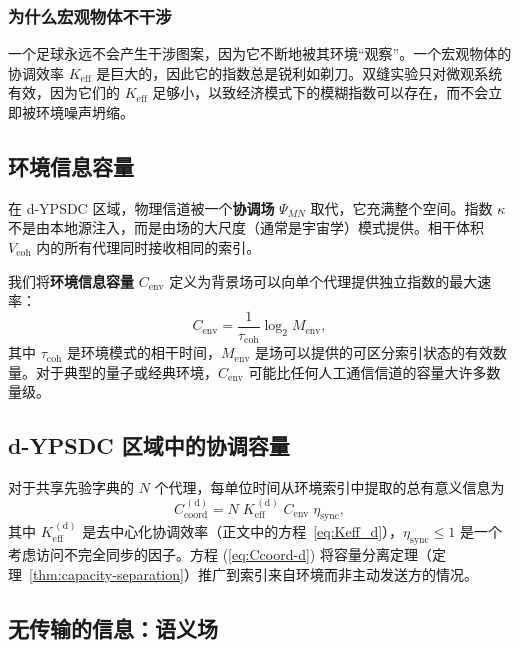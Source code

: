 \documentclass[12pt,a4paper]{article}
\theoremstyle{remark}
\begin{document}
	\subsubsection{为什么宏观物体不干涉}
	
	一个足球永远不会产生干涉图案，因为它不断地被其环境“观察”。一个宏观物体的协调效率 $K_{\mathrm{eff}}$ 是巨大的，因此它的指数总是锐利如剃刀。双缝实验只对微观系统有效，因为它们的 $K_{\mathrm{eff}}$ 足够小，以致经济模式下的模糊指数可以存在，而不会立即被环境噪声坍缩。
	
	\subsection{环境信息容量}
	\label{subsec:env-capacity}
	
	在 d-YPSDC 区域，物理信道被一个\textbf{协调场} $\Psi_{MN}$ 取代，它充满整个空间。指数 $\kappa$ 不是由本地源注入，而是由场的大尺度（通常是宇宙学）模式提供。相干体积 $V_{\mathrm{coh}}$ 内的所有代理同时接收相同的索引。
	
	我们将\textbf{环境信息容量} $C_{\mathrm{env}}$ 定义为背景场可以向单个代理提供独立指数的最大速率：
	\begin{equation}
		C_{\mathrm{env}} = \frac{1}{\tau_{\mathrm{coh}}} \log_2 M_{\mathrm{env}},
		\label{eq:Cenv}
	\end{equation}
	其中 $\tau_{\mathrm{coh}}$ 是环境模式的相干时间，$M_{\mathrm{env}}$ 是场可以提供的可区分索引状态的有效数量。对于典型的量子或经典环境，$C_{\mathrm{env}}$ 可能比任何人工通信信道的容量大许多数量级。
	
	\subsection{d-YPSDC 区域中的协调容量}
	\label{subsec:coord-capacity-dypsdc}
	
	对于共享先验字典的 $N$ 个代理，每单位时间从环境索引中提取的总有意义信息为
	\begin{equation}
		C_{\mathrm{coord}}^{\,(\mathrm{d})} = N \; K_{\mathrm{eff}}^{\,(\mathrm{d})} \;
		C_{\mathrm{env}} \; \eta_{\mathrm{sync}},
		\label{eq:Ccoord-d}
	\end{equation}
	其中 $K_{\mathrm{eff}}^{\,(\mathrm{d})}$ 是去中心化协调效率（正文中的方程~\eqref{eq:Keff_d}），$\eta_{\mathrm{sync}} \le 1$ 是一个考虑访问不完全同步的因子。方程 (\ref{eq:Ccoord-d}) 将容量分离定理（定理~\ref{thm:capacity-separation}）推广到索引来自环境而非主动发送方的情况。
	
	\subsection{无传输的信息：语义场}
	\label{subsec:semantic-field}
	
\end{document}

